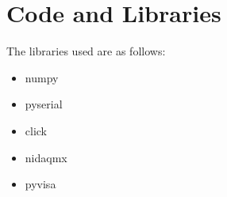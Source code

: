 \documentclass[hidelinks]{article}
\begin{document}
\section{Code and Libraries}
The libraries used are as follows:
\begin{itemize}
    \item numpy
    \item pyserial
    \item click
    \item nidaqmx
    \item pyvisa
\end{itemize}
\end{document}
